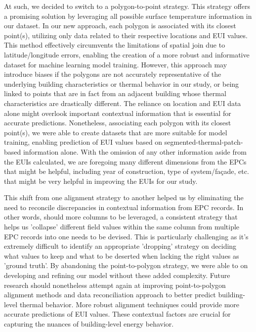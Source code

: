 \documentclass[preprint,12pt]{elsarticle}
\begin{document}
    At such, we decided to switch to a polygon-to-point strategy. This strategy offers a promising solution by leveraging all possible surface temperature information in our dataset. In our new approach, each polygon is associated with its closest point(s), utilizing only data related to their respective locations and EUI values. This method effectively circumvents the limitations of spatial join due to latitude/longitude errors, enabling the creation of a more robust and informative dataset for machine learning model training. However, this approach may introduce biases if the polygons are not accurately representative of the underlying building characteristics or thermal behavior in our study, or being linked to points that are in fact from an adjacent building whose thermal characteristics are drastically different. The reliance on location and EUI data alone might overlook important contextual information that is essential for accurate predictions. Nonetheless, associating each polygon with its closest point(s), we were able to create datasets that are more suitable for model training, enabling prediction of EUI values based on segmented-thermal-patch-based information alone. With the omission of any other information aside from the EUIs calculated, we are foregoing many different dimensions from the EPCs that might be helpful, including year of construction, type of system/façade, etc. that might be very helpful in improving the EUIs for our study.

    This shift from one alignment strategy to another helped us by eliminating the need to reconcile discrepancies in contextual information from EPC records. In other words, should more columns to be leveraged, a consistent strategy that helps us 'collapse' different field values within the same column from multiple EPC records into one needs to be devised. This is particularly challenging as it's extremely difficult to identify an appropriate 'dropping' strategy on deciding what values to keep and what to be deserted when lacking the right values as 'ground truth'. By abandoning the point-to-polygon strategy, we were able to on developing and refining our model without these added complexity. Future research should nonetheless attempt again at improving point-to-polygon alignment methods and data reconciliation approach to better predict building-level thermal behavior. More robust alignment techniques could provide more accurate predictions of EUI values. These contextual factors are crucial for capturing the nuances of building-level energy behavior. 
\end{document}
